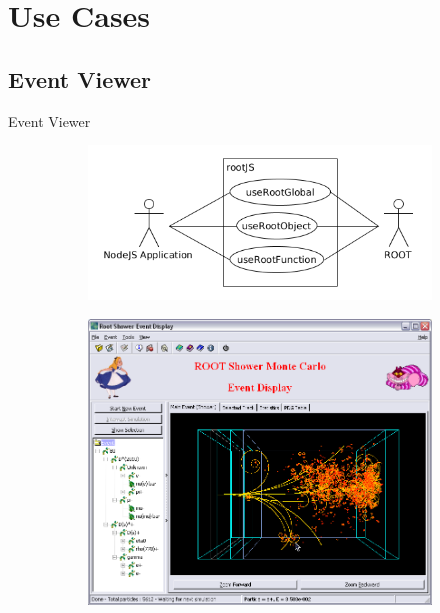 \section{Use Cases}
\subsection{Event Viewer}
\begin{frame}{Event Viewer}

  \begin{figure}[htb]
    \centering
    \begin{subfigure}[b]{0.5\textwidth}
      \includegraphics[width=0.97\linewidth, keepaspectratio]{./resources/usecaseOverview.png}
    \end{subfigure}%
    \begin{subfigure}[b]{0.5\textwidth}
      \includegraphics[width=0.97\linewidth, keepaspectratio]{./resources/shower_event_viewer.png}
      \nocite{cern:eventviewer}
    \end{subfigure}
  \end{figure}
\end{frame}
